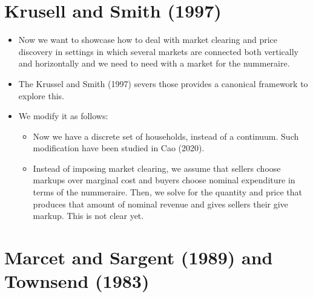 \documentclass[11pt]{article}
\numberwithin{equation}{section}
\begin{document}
\section{Krusell and Smith (1997)}

\begin{itemize}
	\item Now we want to showcase how to deal with market clearing and price discovery in settings in which several markets are connected both vertically and horizontally and we need to need with a market for the nummeraire.
	
	\item The Krussel and Smith (1997) severs those provides a canonical framework to explore this. 
	
	\item We modify it as follows:
	
	\begin{itemize}
		\item Now we have a discrete set of households, instead of a continuum. Such modification have been studied in Cao (2020). 
		
		\item Instead of imposing market clearing, we assume that sellers choose markups over marginal cost and buyers choose nominal expenditure in terms of the nummeraire. Then, we solve for the quantity and price that produces that amount of nominal revenue and gives sellers their give markup. This is not clear yet. 
		
		
	\end{itemize}

\end{itemize}

	\section{Marcet and Sargent (1989) and Townsend (1983)}
	
\end{document}
